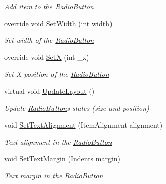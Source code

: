 \begin{DoxyCompactItemize}
\begin{DoxyCompactList}\small\item\em Add item to the \mbox{\hyperlink{class_space_v_i_l_1_1_radio_button}{Radio\+Button}} \end{DoxyCompactList}\item 
override void \mbox{\hyperlink{class_space_v_i_l_1_1_radio_button_a1272cbc6fa73f98592a91b53d1aa280a}{Set\+Width}} (int width)
\begin{DoxyCompactList}\small\item\em Set width of the \mbox{\hyperlink{class_space_v_i_l_1_1_radio_button}{Radio\+Button}} \end{DoxyCompactList}\item 
override void \mbox{\hyperlink{class_space_v_i_l_1_1_radio_button_ad7c30a94e2cb0ef1ee4b7678b7d322ef}{SetX}} (int \+\_\+x)
\begin{DoxyCompactList}\small\item\em Set X position of the \mbox{\hyperlink{class_space_v_i_l_1_1_radio_button}{Radio\+Button}} \end{DoxyCompactList}\item 
virtual void \mbox{\hyperlink{class_space_v_i_l_1_1_radio_button_a899b3a81136fe60e0ad2b1aace9db40c}{Update\+Layout}} ()
\begin{DoxyCompactList}\small\item\em Update \mbox{\hyperlink{class_space_v_i_l_1_1_radio_button}{Radio\+Button}}\textquotesingle{}s states (size and position) \end{DoxyCompactList}\item 
void \mbox{\hyperlink{class_space_v_i_l_1_1_radio_button_abf15acaa5c91ecb00c68b660affc39ab}{Set\+Text\+Alignment}} (Item\+Alignment alignment)
\begin{DoxyCompactList}\small\item\em Text alignment in the \mbox{\hyperlink{class_space_v_i_l_1_1_radio_button}{Radio\+Button}} \end{DoxyCompactList}\item 
void \mbox{\hyperlink{class_space_v_i_l_1_1_radio_button_a690a5887128bceef1742933f1078c44c}{Set\+Text\+Margin}} (\mbox{\hyperlink{struct_space_v_i_l_1_1_decorations_1_1_indents}{Indents}} margin)
\begin{DoxyCompactList}\small\item\em Text margin in the \mbox{\hyperlink{class_space_v_i_l_1_1_radio_button}{Radio\+Button}} \end{DoxyCompactList}\item 

\end{DoxyCompactItemize}
